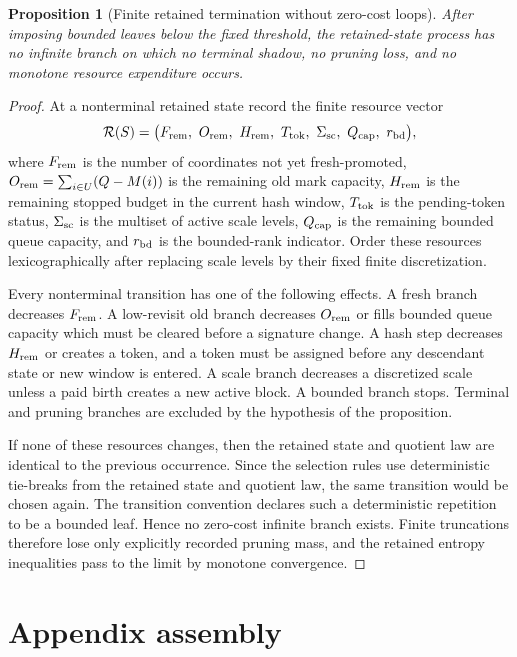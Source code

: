 \documentclass[11pt]{article}
\newtheorem{proposition}[theorem]{Proposition}
\theoremstyle{remark}
\begin{document}
\begin{proposition}[Finite retained termination without zero-cost loops]\label{prop:crit-no-loop}
After imposing bounded leaves below the fixed threshold, the retained-state process has no infinite branch on which no terminal shadow, no pruning loss, and no monotone resource expenditure occurs.
\end{proposition}

\begin{proof}
At a nonterminal retained state record the finite resource vector
\[
\mathcal R(S)=\bigl(F_{\rm rem},\ O_{\rm rem},\ H_{\rm rem},\ T_{\rm tok},\ \Sigma_{\rm sc},\ Q_{\rm cap},\ r_{\rm bd}\bigr),
\]
where $F_{\rm rem}$ is the number of coordinates not yet fresh-promoted, $O_{\rm rem}=\sum_{i\in U}(Q-M(i))$ is the remaining old mark capacity, $H_{\rm rem}$ is the remaining stopped budget in the current hash window, $T_{\rm tok}$ is the pending-token status, $\Sigma_{\rm sc}$ is the multiset of active scale levels, $Q_{\rm cap}$ is the remaining bounded queue capacity, and $r_{\rm bd}$ is the bounded-rank indicator.  Order these resources lexicographically after replacing scale levels by their fixed finite discretization.

Every nonterminal transition has one of the following effects.  A fresh branch decreases $F_{\rm rem}$.  A low-revisit old branch decreases $O_{\rm rem}$ or fills bounded queue capacity which must be cleared before a signature change.  A hash step decreases $H_{\rm rem}$ or creates a token, and a token must be assigned before any descendant state or new window is entered.  A scale branch decreases a discretized scale unless a paid birth creates a new active block.  A bounded branch stops.  Terminal and pruning branches are excluded by the hypothesis of the proposition.

If none of these resources changes, then the retained state and quotient law are identical to the previous occurrence.  Since the selection rules use deterministic tie-breaks from the retained state and quotient law, the same transition would be chosen again.  The transition convention declares such a deterministic repetition to be a bounded leaf.  Hence no zero-cost infinite branch exists.  Finite truncations therefore lose only explicitly recorded pruning mass, and the retained entropy inequalities pass to the limit by monotone convergence.
\end{proof}


\section{Appendix assembly}\label{app:assembly}
\end{document}
